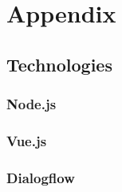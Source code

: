 \section{Appendix}

\subsection{Technologies}

\subsubsection{Node.js}

\subsubsection{Vue.js}

\subsubsection{Dialogflow}

